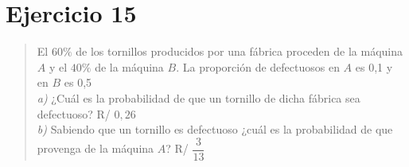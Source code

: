 \documentclass[11pt]{article}
\begin{document}
\newpage
\section*{Ejercicio 15}

\begin{quote}
El $60\%$ de los tornillos producidos por una fábrica proceden de la máquina $A$ y el $40\%$ de la máquina $B$. La proporción de defectuosos en $A$ es 0,1 y en $B$ es 0,5\\
\emph{a)} ¿Cuál es la probabilidad de que un tornillo de dicha fábrica sea defectuoso? \hfill R/ $0,26$\\
\emph{b)} Sabiendo que un tornillo es defectuoso ¿cuál es la probabilidad de que provenga de la máquina $A$? \hfill R/ $\dfrac{3}{13}$
\end{quote}
\end{document}
